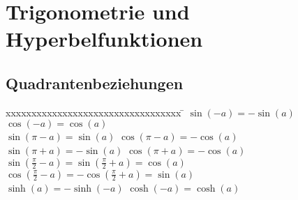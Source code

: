 \section{Trigonometrie und Hyperbelfunktionen}

\subsection{Quadrantenbeziehungen}
\begin{tabbing}
	xxxxxxxxxxxxxxxxxxxxxxxxxxxxxxxxxx \= \kill
	$\sin(-a)=-\sin(a)$ \> $\cos(-a)=\cos(a)$\\
	$\sin(\pi - a)=\sin(a)$ \> $\cos(\pi - a)=-\cos(a)$\\
	$\sin(\pi + a)=-\sin(a)$ \> $\cos(\pi +a)=-\cos(a)$\\
	$\sin\left(\frac{\pi}{2}-a \right)=\sin\left(\frac{\pi}{2}+a \right)=\cos(a)$ \>
	$\cos\left(\frac{\pi}{2}-a \right)=-\cos\left(\frac{\pi}{2}+a \right)=\sin(a)$\\
	$\sinh(a)=-\sinh(-a)$ \> $\cosh(-a)=\cosh(a)$
\end{tabbing}

